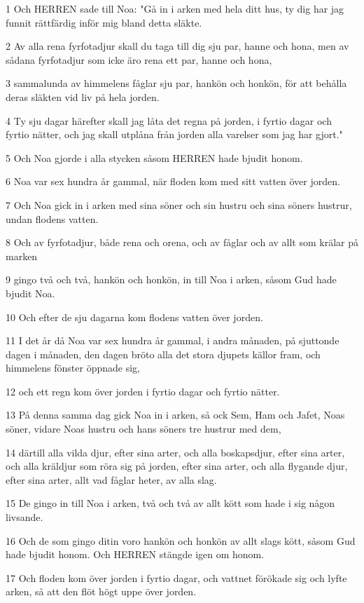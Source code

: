 \par 1 Och HERREN sade till Noa: "Gå in i arken med hela ditt hus, ty dig har jag funnit rättfärdig inför mig bland detta släkte.
\par 2 Av alla rena fyrfotadjur skall du taga till dig sju par, hanne och hona, men av sådana fyrfotadjur som icke äro rena ett par, hanne och hona,
\par 3 sammalunda av himmelens fåglar sju par, hankön och honkön, för att behålla deras släkten vid liv på hela jorden.
\par 4 Ty sju dagar härefter skall jag låta det regna på jorden, i fyrtio dagar och fyrtio nätter, och jag skall utplåna från jorden alla varelser som jag har gjort."
\par 5 Och Noa gjorde i alla stycken såsom HERREN hade bjudit honom.
\par 6 Noa var sex hundra år gammal, när floden kom med sitt vatten över jorden.
\par 7 Och Noa gick in i arken med sina söner och sin hustru och sina söners hustrur, undan flodens vatten.
\par 8 Och av fyrfotadjur, både rena och orena, och av fåglar och av allt som krälar på marken
\par 9 gingo två och två, hankön och honkön, in till Noa i arken, såsom Gud hade bjudit Noa.
\par 10 Och efter de sju dagarna kom flodens vatten över jorden.
\par 11 I det år då Noa var sex hundra år gammal, i andra månaden, på sjuttonde dagen i månaden, den dagen bröto alla det stora djupets källor fram, och himmelens fönster öppnade sig,
\par 12 och ett regn kom över jorden i fyrtio dagar och fyrtio nätter.
\par 13 På denna samma dag gick Noa in i arken, så ock Sem, Ham och Jafet, Noas söner, vidare Noas hustru och hans söners tre hustrur med dem,
\par 14 därtill alla vilda djur, efter sina arter, och alla boskapsdjur, efter sina arter, och alla kräldjur som röra sig på jorden, efter sina arter, och alla flygande djur, efter sina arter, allt vad fåglar heter, av alla slag.
\par 15 De gingo in till Noa i arken, två och två av allt kött som hade i sig någon livsande.
\par 16 Och de som gingo ditin voro hankön och honkön av allt slags kött, såsom Gud hade bjudit honom. Och HERREN stängde igen om honom.
\par 17 Och floden kom över jorden i fyrtio dagar, och vattnet förökade sig och lyfte arken, så att den flöt högt uppe över jorden.
